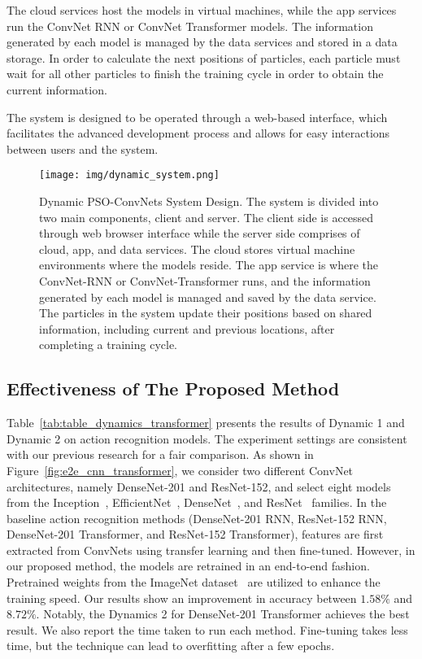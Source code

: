 \documentclass[fleqn,10pt]{wlscirep}
\begin{document}
The cloud services host the models in virtual machines, while the app services run the ConvNet RNN or ConvNet Transformer models. The information generated by each model is managed by the data services and stored in a data storage. In order to calculate the next positions of particles, each particle must wait for all other particles to finish the training cycle in order to obtain the current information.

The system is designed to be operated through a web-based interface, which facilitates the advanced development process and allows for easy interactions between users and the system.
\begin{figure*}[htb!]
\begin{center}
\texttt{[image: img/dynamic\_system.png]}
\caption{Dynamic PSO-ConvNets System Design. The system is divided into two main components, client and server. The client side is accessed through web browser interface while the server side comprises of cloud, app, and data services. The cloud stores virtual machine environments where the models reside. The app service is where the ConvNet-RNN or ConvNet-Transformer runs, and the information generated by each model is managed and saved by the data service. The particles in the system update their positions based on shared information, including current and previous locations, after completing a training cycle.}
\label{fig:dynamic_system}
\end{center}
\end{figure*}
\subsection{Effectiveness of The Proposed Method}


Table~\ref{tab:table_dynamics_transformer} presents the results of Dynamic 1 and Dynamic 2 on action recognition models. The experiment settings are consistent with our previous research for a fair comparison. As shown in Figure~\ref{fig:e2e_cnn_transformer}, we consider two different ConvNet architectures, namely DenseNet-201 and ResNet-152, and select eight models from the Inception~\cite{szegedy2016rethinking}, EfficientNet~\cite{tan2019efficientnet}, DenseNet~\cite{huang2017densely}, and ResNet~\cite{he2016deep} families. In the baseline action recognition methods (DenseNet-201 RNN, ResNet-152 RNN, DenseNet-201 Transformer, and ResNet-152 Transformer), features are first extracted from ConvNets using transfer learning and then fine-tuned. However, in our proposed method, the models are retrained in an end-to-end fashion. Pretrained weights from the ImageNet dataset~\cite{krizhevsky2012imagenet} are utilized to enhance the training speed. Our results show an improvement in accuracy between $1.58\%$ and $8.72\%$. Notably, the Dynamics 2 for DenseNet-201 Transformer achieves the best result. We also report the time taken to run each method. Fine-tuning takes less time, but the technique can lead to overfitting after a few epochs.
\end{document}

